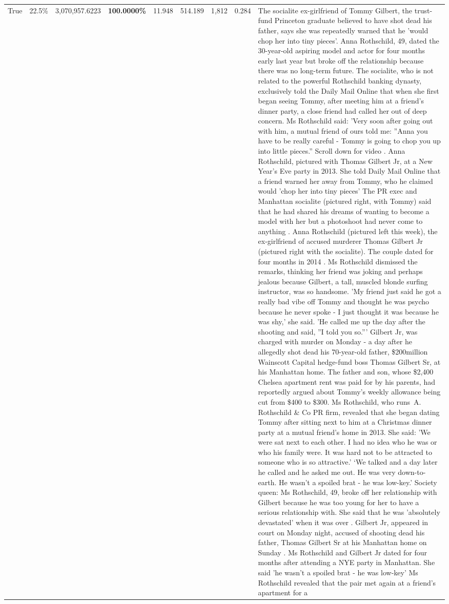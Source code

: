 \begin{table}[H]
\begin{tabular}{lllrlllll}
True & 22.5\% & 3,070,957.6223 & \bfseries \color{red} 100.0000\% & 11.948 & 514.189 & 1,812 & 0.284 & The socialite ex-girlfriend of Tommy Gilbert, the trust-fund Princeton graduate believed to have shot dead his father, says she was repeatedly warned that he 'would chop her into tiny pieces'. Anna Rothschild, 49, dated the 30-year-old aspiring model and actor for four months early last year but broke off the relationship because there was no long-term future. The socialite, who is not related to the powerful Rothschild banking dynasty, exclusively told the Daily Mail Online that when she first began seeing Tommy, after meeting him at a friend's dinner party, a close friend had called her out of deep concern. Ms Rothschild said: 'Very soon after going out with him, a mutual friend of ours told me: ''Anna you have to be really careful - Tommy is going to chop you up into little pieces.'' Scroll down for video . Anna Rothschild, pictured with Thomas Gilbert Jr, at a New Year's Eve party in 2013. She told Daily Mail Online that a friend warned her away from Tommy, who he claimed would 'chop her into tiny pieces' The PR exec and Manhattan socialite (pictured right, with Tommy) said that he had shared his dreams of wanting to become a model with her but a photoshoot had never come to anything . Anna Rothschild (pictured left this week), the ex-girlfriend of accused murderer Thomas Gilbert Jr (pictured right with the socialite). The couple dated for four months in 2014 . Ms Rothschild dismissed the remarks, thinking her friend was joking and perhaps jealous because Gilbert, a tall, muscled blonde surfing instructor, was so handsome. 'My friend just said he got a really bad vibe off Tommy and thought he was psycho because he never spoke - I just thought it was because he was shy,' she said. 'He called me up the day after the shooting and said, ''I told you so.''' Gilbert Jr, was charged with murder on Monday - a day after he allegedly shot dead his 70-year-old father, \$200million Wainscott Capital hedge-fund boss Thomas Gilbert Sr, at his Manhattan home. The father and son, whose \$2,400 Chelsea apartment rent was paid for by his parents, had reportedly argued about Tommy's weekly allowance being cut from \$400 to \$300. Ms Rothschild, who runs A. Rothschild \& Co PR firm, revealed that she began dating Tommy after sitting next to him at a Christmas dinner party at a mutual friend's home in 2013. She said: 'We were sat next to each other. I had no idea who he was or who his family were. It was hard not to be attracted to someone who is so attractive.' ‘We talked and a day later he called and he asked me out. He was very down-to-earth. He wasn’t a spoiled brat - he was low-key.’ Society queen: Ms Rothschild, 49, broke off her relationship with Gilbert because he was too young for her to have a serious relationship with. She said that he was 'absolutely devastated' when it was over . Gilbert Jr, appeared in court on Monday night, accused of shooting dead his father, Thomas Gilbert Sr at his Manhattan home on Sunday . Ms Rothschild and Gilbert Jr dated for four months after attending a NYE party in Manhattan. She said 'he wasn't a spoiled brat - he was low-key' Ms Rothschild revealed that the pair met again at a friend’s apartment for a 
\end{tabular}
\end{table}
